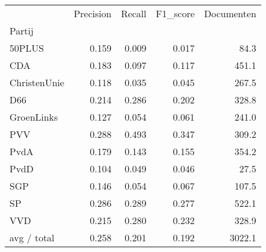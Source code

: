 \begin{tabular}{lrrrr}
\toprule
{} &  Precision &  Recall &  F1\_score &  Documenten \\
Partij       &            &         &           &             \\
\midrule
50PLUS       &      0.159 &   0.009 &     0.017 &        84.3 \\
   CDA       &      0.183 &   0.097 &     0.117 &       451.1 \\
ChristenUnie &      0.118 &   0.035 &     0.045 &       267.5 \\
   D66       &      0.214 &   0.286 &     0.202 &       328.8 \\
  GroenLinks &      0.127 &   0.054 &     0.061 &       241.0 \\
   PVV       &      0.288 &   0.493 &     0.347 &       309.2 \\
  PvdA       &      0.179 &   0.143 &     0.155 &       354.2 \\
  PvdD       &      0.104 &   0.049 &     0.046 &        27.5 \\
   SGP       &      0.146 &   0.054 &     0.067 &       107.5 \\
    SP       &      0.286 &   0.289 &     0.277 &       522.1 \\
   VVD       &      0.215 &   0.280 &     0.232 &       328.9 \\
 avg / total &      0.258 &   0.201 &     0.192 &      3022.1 \\
\bottomrule
\end{tabular}

